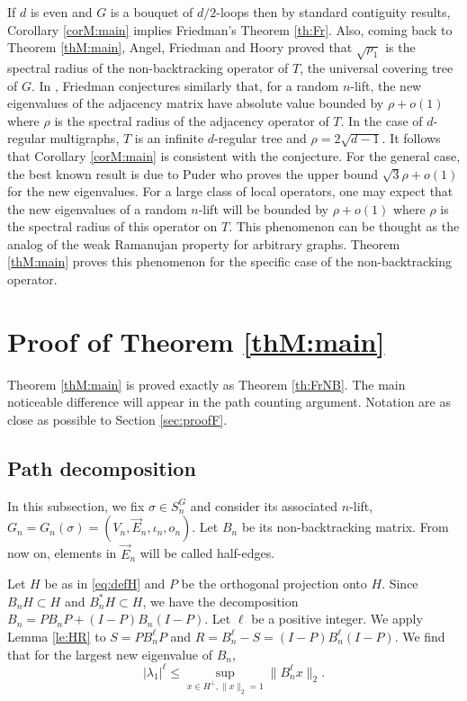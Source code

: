 \documentclass[11pt]{article}
\newcommand{\1}{1\!\!{\sf I}}\newcommand{\IND}{\1}
\begin{document}
If $d$ is even and $G$ is a bouquet of $d/2$-loops then by standard contiguity results, Corollary \ref{corM:main} implies Friedman's Theorem \ref{th:Fr}. Also, coming back to Theorem \ref{thM:main}, Angel, Friedman and Hoory \cite{AFH} proved that $\sqrt{ \rho_1}$ is the spectral radius of  the non-backtracking operator of $T$, the universal covering tree of $G$.  In \cite{MR1978881}, Friedman conjectures similarly that, for a random $n$-lift, the new eigenvalues of the adjacency matrix have absolute value bounded by $\rho + o(1)$ where $\rho$ is the spectral radius of the adjacency operator of $T$. In the case of $d$-regular multigraphs,  $T$ is an infinite $d$-regular tree and $\rho = 2 \sqrt {d-1}$. It follows that Corollary \ref{corM:main} is consistent with the conjecture. For the general case, the best known result is due to Puder \cite{puder} who proves the upper bound $\sqrt3 \rho +o(1)$ for the new eigenvalues. For a large class of local operators, one may expect that the new eigenvalues of a random $n$-lift will be bounded by $\rho + o(1)$   where $\rho$ is the spectral radius of this operator on $T$. This phenomenon can be thought as the analog of the weak Ramanujan property for arbitrary graphs. Theorem \ref{thM:main} proves this phenomenon for the specific case of the non-backtracking operator. 



\section{Proof of  Theorem \ref{thM:main}}

\label{secM:proof}


Theorem \ref{thM:main} is proved exactly as Theorem \ref{th:FrNB}. The main noticeable difference will appear in the path counting argument. Notation are as close as possible to Section \ref{sec:proofF}. 

\subsection{Path decomposition}
\label{subsecM:PD}

In this subsection, we fix $\sigma \in S_n^G$ and consider its associated $n$-lift, $G_n= G_n(\sigma) = (V_n,\vec E_n, \iota_n,o_n)$. Let  $B_n$ be its non-backtracking matrix.  From now on, elements in $\vec E_n$ will be called half-edges. 


Let $H$ be as in \eqref{eq:defH} and $P$ be the orthogonal projection onto $H$. Since $B_n H \subset H$ and $B^*_n H \subset H$, we have the decomposition $B_n = P B_n P + ( I - P) B_n (I-P)$. Let $\ell$ be a positive integer. We apply Lemma \ref{le:HR} to  
$
S=  P B_n^\ell P   
$ and $R = B_n^{\ell} - S = (I - P) B_n^\ell (I-P)$.  We find that for the largest new eigenvalue  of $B_n$, 
\begin{equation}\label{eqM:basicl2}
| \lambda_1|^\ell \leq \sup_{x \in H^\perp , \| x \|_2 = 1}   \| B_n^{\ell} x \|_2 .
\end{equation}
\end{document}
